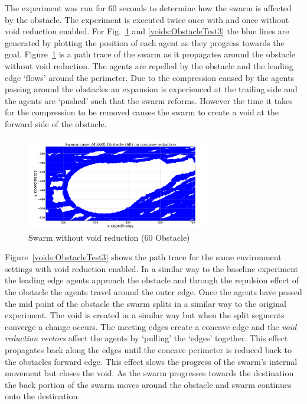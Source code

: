 \documentclass[preprint,12pt]{elsarticle}
\begin{document}
The experiment was run for 60 seconds to determine how the swarm is affected by the obstacle. The experiment is executed twice once with and once without void reduction enabled. For Fig.~\ref{voids:ObstacleTest2} and \ref{voids:ObstacleTest3} the blue lines are generated by plotting the position of each agent as they progress towards the goal. Figure~\ref{voids:ObstacleTest2} is a path trace of the swarm as it propagates around the obstacle without void reduction. The agents are repelled by the obstacle and the leading edge `flows' around the perimeter. Due to the compression caused by the agents passing around the obstacles an expansion is experienced at the trailing side and the agents are `pushed' such that the swarm reforms. However the time it takes for the compression to be removed causes the swarm to create a void at the forward side of the obstacle.  

\begin{figure}
\begin{center}
\includegraphics[width=8cm]{figures/SWARMCOVER456060BASELINE}
\end{center}
\caption{Swarm without void reduction (60 Obstacle)\label{voids:ObstacleTest2}}
\end{figure}
Figure~\ref{voids:ObstacleTest3} shows the path trace for the same environment settings with void reduction enabled. In a similar way to the baseline experiment the leading edge agents approach the obstacle and through the repulsion effect of the obstacle the agents travel around the outer edge. Once the agents have passed the mid point of the obstacle the swarm splits in a similar way to the original experiment. The void is created in a similar way but when the split segments converge a change occurs. The meeting edges create a concave edge and the \textit{void reduction vectors} affect the agents by `pulling' the `edges' together. This effect propagates back along the edges until the concave perimeter is reduced back to the obstacles forward edge. This effect slows the progress of the swarm's internal movement but closes the void. As the swarm progresses towards the destination the back portion of the swarm moves around the obstacle and swarm continues onto the destination.
\end{document}
